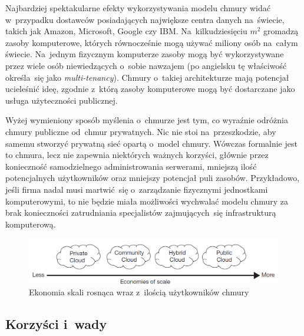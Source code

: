 \documentclass[12pt,a4paper,twoside,titlepage,openright]{book}
\begin{document}
Najbardziej spektakularne efekty wykorzystywania modelu chmury widać w~przypadku dostawców posiadających największe centra danych na~świecie, takich jak Amazon, Microsoft, Google czy IBM. Na~kilkudziesięciu $m^{2}$ gromadzą zasoby komputerowe, których równocześnie mogą używać miliony osób na~całym świecie. Na~jednym fizycznym komputerze zasoby mogą być wykorzystywane przez wiele osób niewiedzących o~sobie nawzajem (po angielsku tę właściwość określa~się jako \textit{multi-tenancy}). Chmury o~takiej architekturze mają potencjał ucieleśnić ideę, zgodnie z~którą zasoby komputerowe mogą być dostarczane jako usługa użyteczności publicznej.

Wyżej wymieniony sposób myślenia o~chmurze jest tym, co wyraźnie odróżnia chmury publiczne od~chmur prywatnych. Nic nie stoi na~przeszkodzie, aby samemu stworzyć prywatną sieć opartą o~model chmury. Wówczas formalnie jest to chmura, lecz nie zapewnia niektórych ważnych korzyści, głównie przez konieczność samodzielnego administrowania serwerami, mniejszą ilość potencjalnych użytkowników oraz mniejszy potencjał puli zasobów. Przykładowo, jeśli firma nadal musi martwić~się o~zarządzanie fizycznymi jednostkami komputerowymi, to nie będzie miała możliwości wychwalać modelu chmury za brak konieczności zatrudniania specjalistów zajmujących~się infrastrukturą komputerową.

\begin{figure}[h]
	\centering
			\includegraphics[width=\textwidth]{ekonomia-skali.png}
		\caption{Ekonomia skali rosnąca wraz z~ilością użytkowników chmury \cite{ccCambridge}}
		\label{fig:ekonomia-skali}
\end{figure}

\subsection*{Korzyści i~wady}
\end{document}
